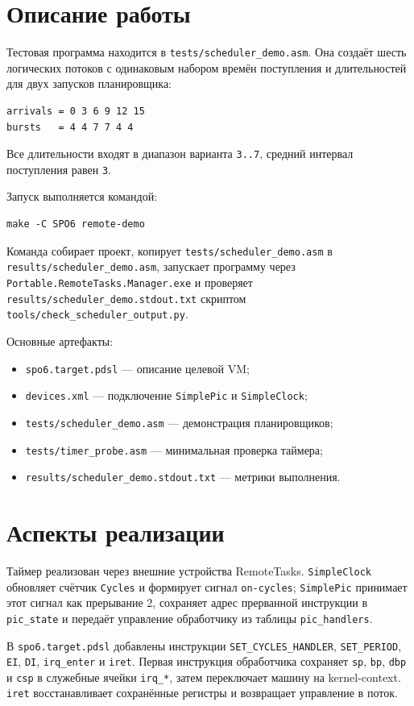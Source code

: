 \documentclass[a4paper,12pt]{article}
\begin{document}
\section{Описание работы}
Тестовая программа находится в \texttt{tests/scheduler\_demo.asm}. Она создаёт шесть логических потоков с одинаковым набором времён поступления и длительностей для двух запусков планировщика:
\begin{lstlisting}
arrivals = 0 3 6 9 12 15
bursts   = 4 4 7 7 4 4
\end{lstlisting}

Все длительности входят в диапазон варианта \texttt{3..7}, средний интервал поступления равен \texttt{3}.

Запуск выполняется командой:
\begin{lstlisting}
make -C SPO6 remote-demo
\end{lstlisting}

Команда собирает проект, копирует \texttt{tests/scheduler\_demo.asm} в \texttt{results/scheduler\_demo.asm}, запускает программу через \texttt{Portable.RemoteTasks.Manager.exe} и проверяет \texttt{results/scheduler\_demo.stdout.txt} скриптом \texttt{tools/check\_scheduler\_output.py}.

Основные артефакты:
\begin{itemize}
\item \texttt{spo6.target.pdsl} — описание целевой VM;
\item \texttt{devices.xml} — подключение \texttt{SimplePic} и \texttt{SimpleClock};
\item \texttt{tests/scheduler\_demo.asm} — демонстрация планировщиков;
\item \texttt{tests/timer\_probe.asm} — минимальная проверка таймера;
\item \texttt{results/scheduler\_demo.stdout.txt} — метрики выполнения.
\end{itemize}

\section{Аспекты реализации}
Таймер реализован через внешние устройства RemoteTasks. \texttt{SimpleClock} обновляет счётчик \texttt{Cycles} и формирует сигнал \texttt{on-cycles}; \texttt{SimplePic} принимает этот сигнал как прерывание 2, сохраняет адрес прерванной инструкции в \texttt{pic\_state} и передаёт управление обработчику из таблицы \texttt{pic\_handlers}.

В \texttt{spo6.target.pdsl} добавлены инструкции \texttt{SET\_CYCLES\_HANDLER}, \texttt{SET\_PERIOD}, \texttt{EI}, \texttt{DI}, \texttt{irq\_enter} и \texttt{iret}. Первая инструкция обработчика сохраняет \texttt{sp}, \texttt{bp}, \texttt{dbp} и \texttt{csp} в служебные ячейки \texttt{irq\_*}, затем переключает машину на kernel-context. \texttt{iret} восстанавливает сохранённые регистры и возвращает управление в поток.
\end{document}
